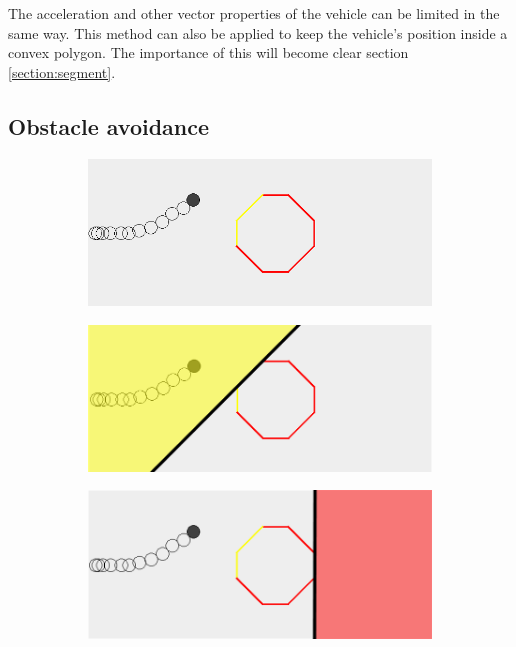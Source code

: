 The acceleration and other vector properties of the vehicle can be limited in the same way. This method can also be applied to keep the vehicle's position inside a convex polygon. The importance of this will become clear section \ref{section:segment}.
\subsection{Obstacle avoidance}

\begin{figure}[!t]
    \centering
    
    \begin{subfigure}[t]{0.47\textwidth}
        \includegraphics[width=\textwidth]{img/obs1}
        \caption{}
    \end{subfigure}
    \hfil
    \begin{subfigure}[t]{0.47\textwidth}
        \includegraphics[width=\textwidth]{img/obs2}
        \caption{}
    \end{subfigure}
    \par\bigskip
    \begin{subfigure}[t]{0.47\textwidth}
        \includegraphics[width=\textwidth]{img/obs3}

\end{subfigure}
\end{figure}
